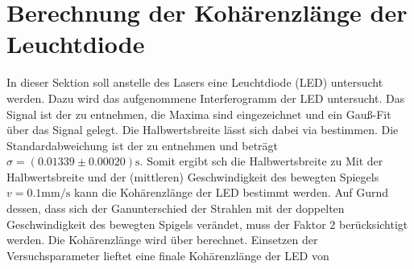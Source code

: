 \section[Kohärenzlänge der LED]{Berechnung der Kohärenzlänge der Leuchtdiode}
\label{sec:A3}
In dieser Sektion soll anstelle des Lasers eine Leuchtdiode (LED) untersucht werden. Dazu wird das aufgenommene Interferogramm der LED untersucht. Das Signal ist der  zu entnehmen, die Maxima sind eingezeichnet und ein Gauß-Fit über das Signal gelegt. 
Die Halbwertsbreite lässt sich dabei via
bestimmen. Die Standardabweichung ist der  zu entnehmen und beträgt $\sigma = (0.01339 \pm 0.00020)\mathrm{s}$. Somit ergibt sch die Halbwertsbreite zu
Mit der Halbwertsbreite und der (mittleren) Geschwindigkeit des bewegten Spiegels $v = 0.1 \mathrm{mm/s}$ kann die Kohärenzlänge der LED bestimmt werden. Auf Gurnd dessen, dass sich der Ganunterschied der Strahlen mit der doppelten Geschwindigkeit des bewegten Spigels verändet, muss der Faktor $2$ berücksichtigt werden. Die Kohärenzlänge wird über
berechnet. Einsetzen der Versuchsparameter lieftet eine finale Kohärenzlänge der LED von 
